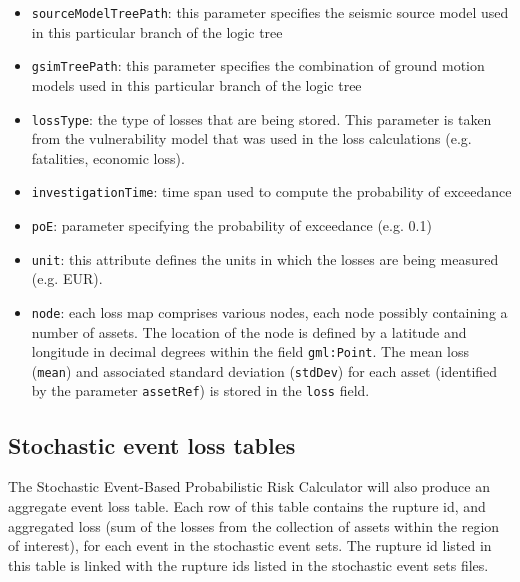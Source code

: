 \begin{itemize}

  \item \Verb+sourceModelTreePath+: this parameter specifies the seismic
    source model used in this particular branch of the logic tree

  \item \Verb+gsimTreePath+: this parameter specifies the combination of
    ground motion models used in this particular branch of the logic tree

  \item \Verb+lossType+: the type of losses that are being stored. This
    parameter is taken from the \gls{vulnerability model} that was used in the
    loss calculations (e.g. fatalities, economic loss).

  \item \Verb+investigationTime+: time span used to compute the probability of
    exceedance
  
  \item \Verb+poE+: parameter specifying the probability of exceedance (e.g. 0.1)

  \item \Verb+unit+: this attribute defines the units in which the losses are
    being measured (e.g. EUR).

  \item \Verb+node+: each loss map comprises various nodes, each node possibly
    containing a number of \glspl{asset}. The location of the node is defined
    by a latitude and longitude in decimal degrees within the field
    \Verb+gml:Point+. The mean loss (\Verb+mean+) and associated standard
    deviation (\Verb+stdDev+) for each \gls{asset} (identified by the parameter
    \Verb+assetRef+) is stored in the \Verb+loss+ field.

\end{itemize}


\subsection{Stochastic event loss tables}

The Stochastic Event-Based Probabilistic Risk Calculator will also produce an
aggregate event loss table. Each row of this table contains the rupture id,
and aggregated loss (sum of the losses from the collection of assets within
the region of interest), for each event in the stochastic event sets. The
rupture id listed in this table is linked with the rupture ids listed in the
stochastic event sets files.


